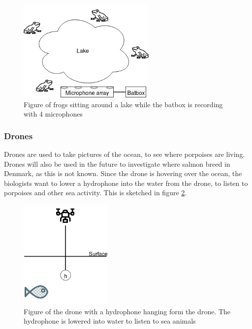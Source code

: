 \begin{figure}[H]
	\centering
	\includegraphics[width=0.6\textwidth]{figures/usecases_frogs}
	\caption{Figure of frogs sitting around a lake while the batbox is recording with 4 microphones} \label{fig:usecase:frogs}
\end{figure}

\subsubsection{Drones}
Drones are used to take pictures of the ocean, to see where porpoises are living. Drones will also be used in the future to investigate where salmon breed in Denmark, as this is not known. Since the drone is hovering over the ocean, the biologists want to lower a hydrophone into the water from the drone, to listen to porpoises and other sea activity. This is sketched in figure \ref{fig:usecase:drone}.

\begin{figure}[h!]
	\centering
	\includegraphics[width=0.4\textwidth]{figures/usecase_drone}
	\caption{Figure of the drone with a hydrophone hanging form the drone. The hydrophone is lowered into water to listen to sea animals}\label{fig:usecase:drone}
\end{figure}

